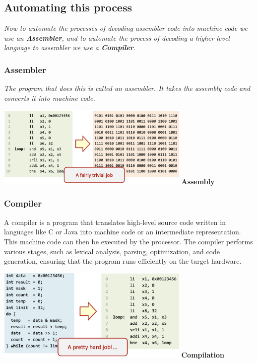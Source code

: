 \newpage
\subsection{Automating this process}
\textit{Now to automate the processes of decoding assembler code into machine code we use an \textbf{Assembler}, and to automate the process of decoding a higher level language to assembler we use a \textbf{Compiler}}. \newline
\subsubsection{Assembler}
\textit{The program that does this is called an assembler. It takes the assembly code and converts it into machine code.} \newline
\begin{center}
    \includegraphics[width=0.7\textwidth]{chapters/chapter1/images/assembler.png}
    \centering
    \textbf{Assembly}
\end{center}
\subsubsection{Compiler}
A compiler is a program that translates high-level source code written in languages like C or Java into machine code or an intermediate representation. This machine code can then be executed by the processor. The compiler performs various stages, such as lexical analysis, parsing, optimization, and code generation, ensuring that the program runs efficiently on the target hardware.
\begin{center}
    \includegraphics[width=0.7\textwidth]{chapters/chapter1/images/compiler.png}
    \centering
    \textbf{Compilation}
\end{center}

